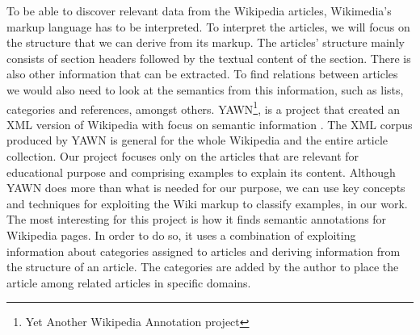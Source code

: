 To be able to discover relevant data from the Wikipedia articles, Wikimedia's markup language has to be interpreted.  To interpret the articles, we will focus on the structure that we can derive from its markup. The articles' structure mainly consists of section headers followed by the textual content of the section. There is also other information that can be extracted. To find relations between articles we would also need to look at the semantics from this information, such as lists, categories and references, amongst others. YAWN\footnote{Yet Another Wikipedia Annotation project}, is a project that created an XML version of Wikipedia with focus on semantic information \cite{yawn}. The XML corpus produced by YAWN is general for the whole Wikipedia and the entire article collection. Our project focuses only on the articles that are relevant for educational purpose and comprising examples to explain its content. Although YAWN does more than what is needed for our purpose, we can use key concepts and techniques for exploiting the Wiki markup to classify examples, in our work. The most interesting for this project is how it finds semantic annotations for Wikipedia pages. In order to do so, it uses a combination of exploiting information about categories assigned to articles and deriving information from the structure of an article. The categories are added by the author to place the article among related articles in specific domains.

